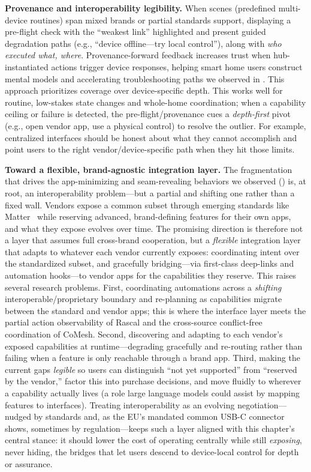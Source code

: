 \noindent\textbf{Provenance and interoperability legibility.}
When scenes (predefined multi-device routines) span mixed brands or partial standards support, displaying a pre-flight check with the ``weakest link'' highlighted and present guided degradation paths (e.g., ``device offline---try local control''), along with \emph{who executed what, where}. Provenance-forward feedback increases trust when hub-instantiated actions trigger device responses, helping smart home users construct mental models and accelerating troubleshooting paths we observed in . This approach prioritizes coverage over device-specific depth. This works well for routine, low-stakes state changes and whole-home coordination; when a capability ceiling or failure is detected, the pre-flight/provenance cues a \emph{depth-first} pivot (e.g., open vendor app, use a physical control) to resolve the outlier. For example, centralized interfaces should be honest about what they cannot accomplish and point users to the right vendor/device-specific path when they hit those limits.

\noindent\textbf{Toward a flexible, brand-agnostic integration layer.}
The fragmentation that drives the app-minimizing and seam-revealing behaviors we observed () is, at root, an interoperability problem---but a partial and shifting one rather than a fixed wall. Vendors expose a common subset through emerging standards like Matter~\cite{matter} while reserving advanced, brand-defining features for their own apps, and what they expose evolves over time. The promising direction is therefore not a layer that assumes full cross-brand cooperation, but a \emph{flexible} integration layer that adapts to whatever each vendor currently exposes: coordinating intent over the standardized subset, and gracefully bridging---via first-class deep-links and automation hooks---to vendor apps for the capabilities they reserve. This raises several research problems. First, coordinating automations across a \emph{shifting} interoperable/proprietary boundary and re-planning as capabilities migrate between the standard and vendor apps; this is where the interface layer meets the partial action observability of Rascal and the cross-source conflict-free coordination of CoMesh. Second, discovering and adapting to each vendor's exposed capabilities at runtime---degrading gracefully and re-routing rather than failing when a feature is only reachable through a brand app. Third, making the current gaps \emph{legible} so users can distinguish ``not yet supported'' from ``reserved by the vendor,'' factor this into purchase decisions, and move fluidly to wherever a capability actually lives (a role large language models could assist by mapping features to interfaces). Treating interoperability as an evolving negotiation---nudged by standards and, as the EU's mandated common USB-C connector shows, sometimes by regulation---keeps such a layer aligned with this chapter's central stance: it should lower the cost of operating centrally while still \emph{exposing}, never hiding, the bridges that let users descend to device-local control for depth or assurance.

